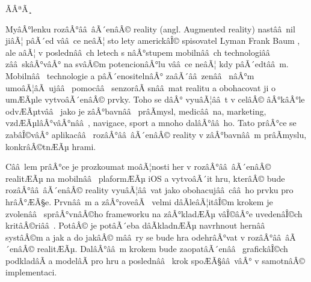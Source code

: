 \documentclass[twoside,12pt]{article}
\begin{document}
\def\,{\penalty10000\hskip.25em}
\pagestyle{headings}

\bakalarska





 
\newpage\null\thispagestyle{empty}\newpage




\obsah


ÃÂªÃ¸%
%

% 
MyâÂ°lenku rozâÂ°ââ âÃ´enâÂ© reality (angl. Augmented reality) nastââ nil jiâÃ¦ pâÃ´ed vââ ce neâÃ¦ sto lety americkâÎ© spisovatel Lyman Frank Baum \cite{baum}, ale aâÃ¦ v poslednââ ch letech s nâÂ°stupem mobilnââ ch technologiââ  zââ skâÂ°vâÂ° na svâÂ©m potencionâÂ°lu vââ ce neâÃ¦ kdy pâÃ´edtââ m. Mobilnââ  technologie a pâÃ´enositelnâÂ° zaâÃ´ââ zenââ  nâÂ°m umoâÃ¦âÃ ujââ  pomocââ  senzorâÃ snââ mat realitu a obohacovat ji o umÆÃµle vytvoâÃ´enâÂ© prvky. Toho se dâÂ° vyuâÃ¦ââ t v celâÂ© âÂ°kâÂ°le odvÆÃµtvââ  jako je zâÂ°bavnââ  prâÃmysl, medicââ na, marketing, vzdÆÃµlâÂ°vâÂ°nââ , navigace, sport a mnoho dalâÂ°ââ ho. Tato prâÂ°ce se zabâÎ©vâÂ° aplikacââ  rozâÂ°ââ âÃ´enâÂ© reality v zâÂ°bavnââ m prâÃmyslu, konkrâÂ©tnÆÃµ hrami. 

% 
Cââ lem prâÂ°ce je prozkoumat moâÃ¦nosti her v rozâÂ°ââ âÃ´enâÂ© realitÆÃµ na mobilnââ  plaformÆÃµ iOS a vytvoâÃ´it hru, kterâÂ© bude rozâÂ°ââ âÃ´enâÂ© reality vyuâÃ¦ââ vat jako obohacujââ cââ ho prvku pro hrâÂ°ÆÃ§e. Prvnââ m a zâÂ°roveâÃ  velmi dâÃleâÃ¦itâÎ©m krokem je zvolenââ  sprâÂ°vnâÂ©ho frameworku na zâÂ°kladÆÃµ vâÎ©âÂ°e uvedenâÎ©ch kritâÂ©riââ . PotâÂ© je potâÃ´eba dâÃkladnÆÃµ navrhnout hernââ  systâÂ©m a jak a do jakâÂ© mââ ry se bude hra odehrâÂ°vat v rozâÂ°ââ âÃ´enâÂ© realitÆÃµ. DalâÂ°ââ m krokem bude zaopatâÃ´enââ  grafickâÎ©ch podkladâÃ a modelâÃ pro hru a poslednââ  krok spoÆÃ§ââ vâÂ° v samotnâÂ© implementaci.
\end{document}
